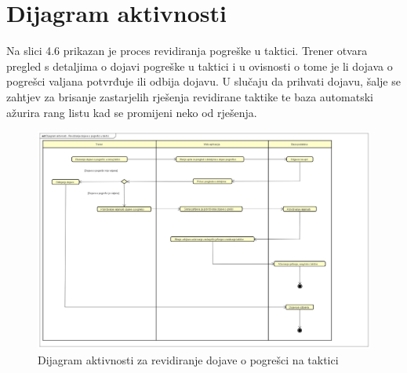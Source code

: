 			
		\section{Dijagram aktivnosti}
		
		Na slici 4.6 prikazan je proces revidiranja pogreške u taktici. Trener otvara pregled s detaljima o dojavi pogreške u taktici i u ovisnosti o tome je li dojava o pogrešci valjana potvrđuje ili odbija dojavu. U slučaju da prihvati dojavu, šalje se zahtjev za brisanje zastarjelih rješenja revidirane taktike te baza automatski ažurira rang listu kad se promijeni neko od rješenja.
			
				\begin{figure}[H]
				\centerfloat
				\includegraphics[scale=0.25]{dijagrami/dijakt.jpg} %
				\caption{Dijagram aktivnosti za revidiranje dojave o pogrešci na taktici}
				\label{fig:UC9}
			\end{figure}
			
			\eject
